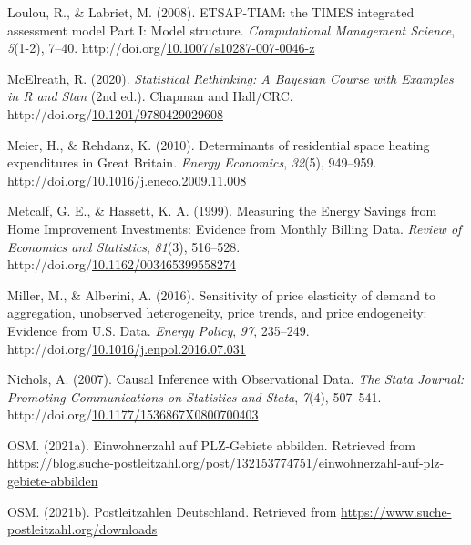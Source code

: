 \documentclass[12pt,twoside]{reedthesis}
\newlength{\cslhangindent}
\newenvironment{CSLReferences}[2] %
 {%
  \setlength{\parindent}{0pt}
  \ifodd #1 \everypar{\setlength{\hangindent}{\cslhangindent}}\ignorespaces\fi
  \ifnum #2 > 0
  \setlength{\parskip}{#2\baselineskip}
  \fi
 }%
 {}
\begin{document}
\begin{CSLReferences}{1}{0}
\leavevmode{}%
Loulou, R., \& Labriet, M. (2008). ETSAP-TIAM: the TIMES integrated assessment model Part I: Model structure. \emph{Computational Management Science}, \emph{5}(1-2), 7--40. http://doi.org/\href{https://doi.org/10.1007/s10287-007-0046-z}{10.1007/s10287-007-0046-z}

\leavevmode{}%
McElreath, R. (2020). \emph{Statistical Rethinking: A Bayesian Course with Examples in R and Stan} (2nd ed.). Chapman and Hall/CRC. http://doi.org/\href{https://doi.org/10.1201/9780429029608}{10.1201/9780429029608}

\leavevmode{}%
Meier, H., \& Rehdanz, K. (2010). Determinants of residential space heating expenditures in Great Britain. \emph{Energy Economics}, \emph{32}(5), 949--959. http://doi.org/\href{https://doi.org/10.1016/j.eneco.2009.11.008}{10.1016/j.eneco.2009.11.008}

\leavevmode{}%
Metcalf, G. E., \& Hassett, K. A. (1999). Measuring the Energy Savings from Home Improvement Investments: Evidence from Monthly Billing Data. \emph{Review of Economics and Statistics}, \emph{81}(3), 516--528. http://doi.org/\href{https://doi.org/10.1162/003465399558274}{10.1162/003465399558274}

\leavevmode{}%
Miller, M., \& Alberini, A. (2016). Sensitivity of price elasticity of demand to aggregation, unobserved heterogeneity, price trends, and price endogeneity: Evidence from U.S. Data. \emph{Energy Policy}, \emph{97}, 235--249. http://doi.org/\href{https://doi.org/10.1016/j.enpol.2016.07.031}{10.1016/j.enpol.2016.07.031}

\leavevmode{}%
Nichols, A. (2007). Causal Inference with Observational Data. \emph{The Stata Journal: Promoting Communications on Statistics and Stata}, \emph{7}(4), 507--541. http://doi.org/\href{https://doi.org/10.1177/1536867X0800700403}{10.1177/1536867X0800700403}

\leavevmode{}%
OSM. (2021a). Einwohnerzahl auf PLZ-Gebiete abbilden. Retrieved from \url{https://blog.suche-postleitzahl.org/post/132153774751/einwohnerzahl-auf-plz-gebiete-abbilden}

\leavevmode{}%
OSM. (2021b). Postleitzahlen Deutschland. Retrieved from \url{https://www.suche-postleitzahl.org/downloads}


\end{CSLReferences}
\end{document}
